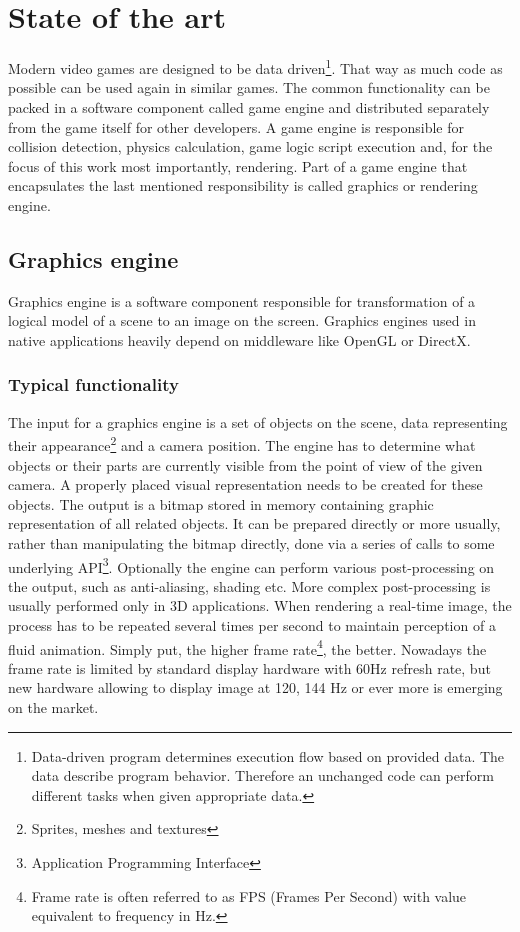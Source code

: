 \documentclass[11pt,oneside, final]{fithesis2}
\begin{document}
\chapter{State of the art}
\label{theory}

Modern video games are designed to be data driven\footnote{Data-driven program determines execution flow based on provided data. The data describe program behavior. Therefore an unchanged code can perform different tasks when given appropriate data.\cite{charniak}}. That way as much code as possible can be used again in similar games. The common functionality can be packed in a software component called game engine\cite{gregory} and distributed separately from the game itself for other developers. A game engine is responsible for collision detection, physics calculation, game logic script execution and, for the focus of this work most importantly, rendering. Part of a game engine that encapsulates the last mentioned responsibility is called graphics or rendering engine.

\section{Graphics engine}
Graphics engine is a software component responsible for transformation of a logical model of a scene to an image on the screen. Graphics engines used in native applications heavily depend on middleware like OpenGL or DirectX\cite{gregory}.

\subsection{Typical functionality}
\label{enginefunctionality}
The input for a graphics engine is a set of objects on the scene, data representing their appearance\footnote{Sprites, meshes and textures} and a camera position. The engine has to determine what objects or their parts are currently visible from the point of view of the given camera. A properly placed visual representation needs to be created for these objects. The output is a bitmap stored in memory containing graphic representation of all related objects. It can be prepared directly or more usually, rather than manipulating the bitmap directly, done via a series of calls to some underlying API\footnote{Application Programming Interface}. Optionally the engine can perform various post-processing on the output, such as anti-aliasing, shading etc.\cite{gregory} More complex post-processing is usually performed only in 3D applications. When rendering a real-time image, the process has to be repeated several times per second to maintain perception of a fluid animation. Simply put, the higher frame rate\footnote{Frame rate is often referred to as FPS (Frames Per Second) with value equivalent to frequency in Hz.}, the better\cite{claypool}. Nowadays the frame rate is limited by standard display hardware with 60Hz refresh rate, but new hardware allowing to display image at 120, 144 Hz or ever more is emerging on the market.
\end{document}
